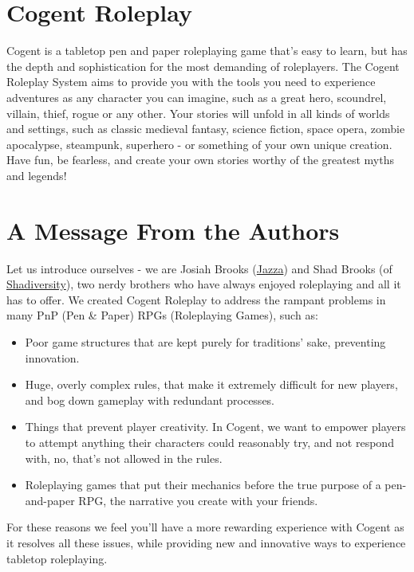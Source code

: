 \section{Cogent Roleplay} \label{sec:cogent_roleplay}

Cogent is a tabletop pen and paper roleplaying game that's easy to learn, but has the depth and sophistication for the most demanding of roleplayers. The Cogent Roleplay System aims to provide you with the tools you need to experience adventures as any character you can imagine, such as a great hero, scoundrel, villain, thief, rogue or any other. Your stories will unfold in all kinds of worlds and settings, such as classic medieval fantasy, science fiction, space opera, zombie apocalypse, steampunk, superhero - or something of your own unique creation. Have fun, be fearless, and create your own stories worthy of the greatest myths and legends!

\section{A Message From the Authors} \label{sec:message_from_authors}

Let us introduce ourselves - we are Josiah Brooks (\href{https://www.youtube.com/channel/UCHu2KNu6TtJ0p4hpSW7Yv7Q}{Jazza}) and Shad Brooks (of \href{https://www.youtube.com/channel/UCkmMACUKpQeIxN9D9ARli1Q}{Shadiversity}), two nerdy brothers who have always enjoyed roleplaying and all it has to offer. We created Cogent Roleplay to address the rampant problems in many PnP (Pen \& Paper) RPGs (Roleplaying Games), such as:

\begin{itemize}
    \item Poor game structures that are kept purely for traditions' sake, preventing innovation.
    \item Huge, overly complex rules, that make it extremely difficult for new players, and bog down gameplay with redundant processes.
    \item Things that prevent player creativity. In Cogent, we want to empower players to attempt anything their characters could reasonably try, and not respond with, no, that's not allowed in the rules.
    \item Roleplaying games that put their mechanics before the true purpose of a pen-and-paper RPG, the narrative you create with your friends.
\end{itemize}

For these reasons we feel you'll have a more rewarding experience with Cogent as it resolves all these issues, while providing new and innovative ways to experience tabletop roleplaying.

